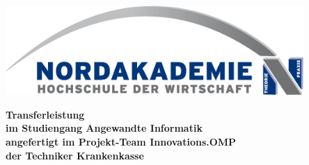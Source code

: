
\thispagestyle{empty}
\begin{center}
\vspace*{-2cm}
\includegraphics[width=0.85\textwidth]{Bilder/Logo_NAK}\\
\vspace*{1.5cm}
    {\titlefont\huge\onehalfspacing{}
	\thetitle{}
    \par}%
\vfill
{
\vspace*{1.5cm}
    \normalfont\normalcolor\bfseries\large
    Transferleistung \\
    \large
    im Studiengang Angewandte Informatik\\
    angefertigt im Projekt-Team Innovations.OMP\\
    der Techniker Krankenkasse\\
    \par
}
\end{center}\par
\noindent\begin{minipage}[b]{\textwidth}
{
  \vspace*{5cm}
  \noindent\textbf{\theLocationAndDate}
}
\end{minipage}
